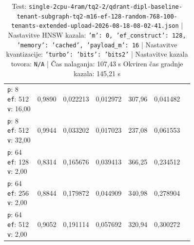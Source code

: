 \begin{table}[htbp]
\begin{tabularx}{\textwidth}{Xrrrrrr}
    \makecell{\texttt{p}: 8\\\texttt{ef}: 512\\\texttt{v}: 16,00} & 0,9890 & 0,022213 & 0,012972 & 307,96 & 0,041482 \\
    \makecell{\texttt{p}: 8\\\texttt{ef}: 512\\\texttt{v}: 32,00} & 0,9944 & 0,033202 & 0,017023 & 237,08 & 0,061553 \\
    \makecell{\texttt{p}: 64\\\texttt{ef}: 128\\\texttt{v}: 2,00} & 0,8314 & 0,165676 & 0,039413 & 366,25 & 0,234512 \\
    \makecell{\texttt{p}: 64\\\texttt{ef}: 256\\\texttt{v}: 2,00} & 0,8844 & 0,179872 & 0,044909 & 340,98 & 0,278904 \\
    \makecell{\texttt{p}: 64\\\texttt{ef}: 512\\\texttt{v}: 2,00} & 0,9052 & 0,191114 & 0,057692 & 320,94 & 0,300272 \\
    \bottomrule
  \end{tabularx}
\caption* {Test: \texttt{single-2cpu-4ram/tq2-2/qdrant-dipl-baseline-tenant-subgraph-tq2-m16-ef-128-random-768-100-tenants-extended-upload-2026-08-18-08-02-41.json} | Nastavitve HNSW kazala: \texttt{{'m': 0, 'ef\_construct': 128, 'memory': 'cached', 'payload\_m': 16}} | Nastavitve kvantizacije: \texttt{{'turbo': {'bits': 'bits2'}}} | Nastavitve kazala tovora: \texttt{N/A} | Čas nalaganja: 107,43 s Okviren čas gradnje kazala: 145,21 s}\end{table}


